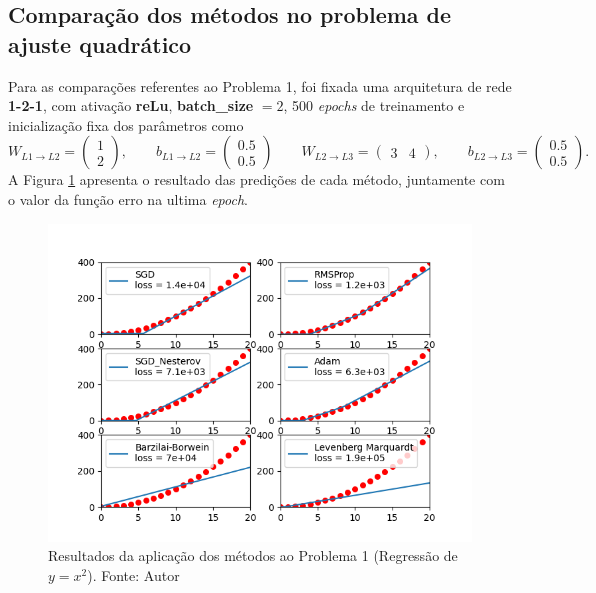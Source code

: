 \documentclass[11pt]{article}
\begin{document}
\subsection*{Comparação dos métodos no problema de ajuste  quadrático}
Para as comparações referentes ao Problema 1, foi fixada uma arquitetura de rede \textbf{1-2-1}, com ativação \textbf{reLu}, \textbf{batch\_size} $ = 2$,  500 \textit{epochs} de treinamento e inicialização fixa dos parâmetros como 
$$W_{L1\rightarrow L2} = \begin{pmatrix} 1 \\ 2\end{pmatrix}, \qquad b_{L1\rightarrow L2} = \begin{pmatrix} 0.5 \\ 0.5\end{pmatrix}\qquad W_{L2\rightarrow L3} = \begin{pmatrix} 3 & 4\end{pmatrix}, \qquad b_{L2\rightarrow L3} = \begin{pmatrix} 0.5 \\ 0.5\end{pmatrix}.$$ 
A Figura \ref{REG} apresenta o resultado das predições de cada método, juntamente com o valor da função erro na ultima \textit{epoch}.

\begin{figure}[H]
\center
\includegraphics[scale=0.7]{Figuras/REG.png}
\caption{Resultados da aplicação dos métodos ao Problema 1 (Regressão de  $y = x^2$). Fonte: Autor} 
\label{REG}
\end{figure}
\end{document}
